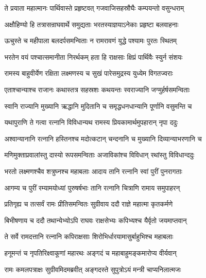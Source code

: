
\twolineshloka
{ते प्रयाता महात्मानः पार्थिवास्ते प्रहृष्टवत्}
{गजवाजिसहस्रौघैः कम्पयन्तो वसुन्धराम्} %

\twolineshloka
{अक्षौहिण्यो हि तत्रासन्राघवार्थे समुद्यताः}
{भरतस्याज्ञयाऽनेकाः प्रहृष्टा बलवाहनाः} %

\twolineshloka
{ऊचुस्ते च महीपाला बलदर्पसमन्विताः}
{न रामरावणं युद्धे पश्यामः पुरतः स्थितम्} %

\twolineshloka
{भरतेन वयं पश्चात्समानीता निरर्थकम्}
{हता हि राक्षसाः क्षिप्रं पार्थिवैः स्युर्न संशयः} %

\twolineshloka
{रामस्य बाहुवीर्येण रक्षिता लक्ष्मणस्य च}
{सुखं पारेसमुद्रस्य युध्येम विगतज्वराः} %

\twolineshloka
{एताश्चान्याश्च राजानः कथास्तत्र सहस्रशः}
{कथयन्तः स्वराज्यानि जग्मुर्हर्षसमन्विताः} %

\twolineshloka
{स्वानि राज्यानि मुख्यानि ऋद्धानि मुदितानि च}
{समृद्धधनधान्यानि पूर्णानि वसुमन्ति च} %

\twolineshloka
{यथापुराणि ते गत्वा रत्नानि विविधान्यथ}
{रामस्य प्रियकामार्थमुपहारान् नृपा ददुः} %

\twolineshloka
{अश्वान्यानानि रत्नानि हस्तिनश्च मदोत्कटान्}
{चन्दनानि च मुख्यानि दिव्यान्याभरणानि च} %

\twolineshloka
{मणिमुक्ताप्रवालांस्तु दास्यो रूपसमन्विताः}
{अजाविकांश्च विविधान् रथांस्तु विविधान्ददुः} %

\twolineshloka
{भरतो लक्ष्मणश्चैव शत्रुघ्नश्च महाबलाः}
{आदाय तानि रत्नानि स्वां पुरीं पुनरागताः} %

\twolineshloka
{आगम्य च पुरीं रम्यामयोध्यां पुरुषर्षभाः}
{तानि रत्नानि चित्राणि रामाय समुपाहरन्} %

\twolineshloka
{प्रतिगृह्य च तत्सर्वं रामः प्रीतिसमन्वितः}
{सुग्रीवाय ददौ राज्ञे महात्मा कृतकर्मणे} %

\twolineshloka
{बिभीषणाय च ददौ तथान्येभ्योऽपि राघवः}
{राक्षसेभ्यः कपिभ्यश्च यैर्वृतो जयमाप्तवान्} %

\twolineshloka
{ते सर्वे रामदत्तानि रत्नानि कपिराक्षसाः}
{शिरोभिर्धारयामासुर्बाहुभिश्च महाबलाः} %

\twolineshloka
{हनूमन्तं च नृपतिरिक्ष्वाकूणां महारथः}
{अङ्गदं च महाबाहुमङ्कमारोप्य वीर्यवान्} %

\twolineshloka
{रामः कमलपत्राक्षः सुग्रीवमिदमब्रवीत्}
{अङ्गदस्ते सुपुत्रोऽयं मन्त्री चाप्यनिलात्मजः} %

